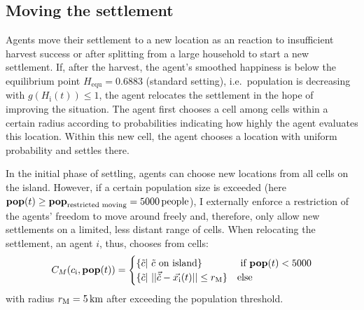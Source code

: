 \subsection{Moving the settlement}
Agents move their settlement to a new location as an reaction to insufficient harvest success or after splitting from a large household to start a new settlement.
If, after the harvest, the agent's smoothed happiness is below the equilibrium point $H_\text{equ}=0.6883$ (standard setting), i.e.\ population is decreasing with $g(H_\text{i}(t))\leq 1$, the agent relocates the settlement in the hope of improving the situation.
The agent first chooses a cell among cells  within a certain radius according to probabilities indicating how highly the agent evaluates this location.
Within this new cell, the agent chooses a location with uniform probability and settles there.

In the initial phase of settling, agents can choose new locations from all cells on the island.
However, if a certain population size is exceeded (here $\mathbf{pop}(t)\geq \mathbf{pop}_\text{restricted moving} = 5000 \, \rm{people}$), I externally enforce a restriction of the agents' freedom to move around freely and, therefore, only allow new settlements on a limited, less distant range of cells. 
When relocating the settlement, an agent $i$, thus, chooses from cells:
\begin{equation}
C_{M}(c_{\rm i}, \mathbf{pop}(t)) = 
\begin{cases}
\{\tilde{c} | \ \tilde{c}\text{ on island}\} & \text{ if } \mathbf{pop}(t) <5000 \\
\{\tilde{c} | \ | | \vec{\tilde{c}} - \vec{x_{\rm i}}(t) | |
\leq r_{\rm M} \} & \text{else} 
\end{cases}
\end{equation}
with radius $r_{\rm M} = 5\, {\rm km}$ after exceeding the population threshold.

